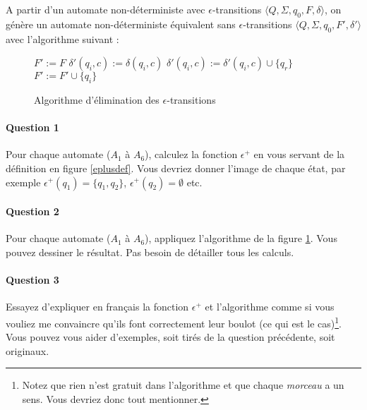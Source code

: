 \documentclass{article}[11pt]
\theoremstyle{definition}
\begin{document}
 
A partir d'un automate non-déterministe avec $\epsilon$-transitions  $\big \langle Q,\Sigma,q_0,F,\delta \big \rangle$, on génère un automate non-déterministe équivalent sans $\epsilon$-transitions  $\big \langle Q,\Sigma,q_0,F',\delta' \big \rangle$ avec l'algorithme suivant :

\begin{figure}[!h]
\begin{algorithmic}[1]
\State $F' := F$
        $\delta'(q_i,c) := \delta(q_i,c)$
    \EndFor
\EndFor
{}
			\State $\delta'(q_i,c) := \delta'(q_i,c) \cup \{q_r\}$
		\EndFor
			\State $F' := F' \cup \{q_i\}$
		\EndIf
	\EndFor
\EndFor
\end{algorithmic}
\caption{Algorithme d'élimination des $\epsilon$-transitions}
\label{algo}
\end{figure}
\vspace{2cm}
\paragraph*{Question 1} Pour chaque automate ($A_1$ à $A_6$), calculez la fonction $\epsilon^+$ en vous servant de la définition en figure \ref{eplusdef}. Vous devriez donner l'image de chaque état, par exemple $\epsilon^+(q_1) = \{q_1,q_2\}$, $\epsilon^+(q_2) = \emptyset$ etc. 

\paragraph*{Question 2} Pour chaque automate ($A_1$ à $A_6$), appliquez l'algorithme de la figure \ref{algo}. Vous pouvez dessiner le résultat. Pas besoin de détailler tous les calculs. 

\paragraph*{Question 3} Essayez d'expliquer en français la fonction $\epsilon^+$ et l'algorithme comme si vous vouliez me convaincre qu'ils font correctement leur boulot (ce qui est le cas)\footnote{Notez que rien n'est gratuit dans l'algorithme et que chaque \textit{morceau} a un sens. Vous devriez donc tout mentionner.}. Vous pouvez vous aider d'exemples, soit tirés de la question précédente, soit originaux.
\end{document}

